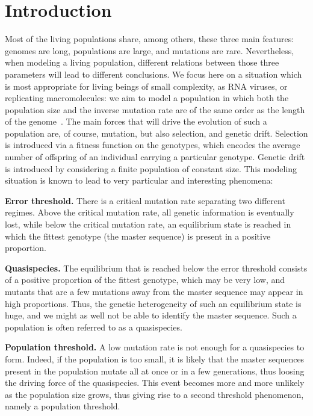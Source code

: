 \documentclass[a4paper,12pt]{article}
\theoremstyle{definition}
\theoremstyle{remark}
\begin{document}
\section{Introduction}
Most of the living populations share, among others, 
these three main features:
genomes are long, populations are large, and mutations are rare.
Nevertheless, when modeling a living population,
different relations between those three parameters
will lead to different conclusions.
We focus here on a situation which is most appropriate 
for living beings of small complexity,
as RNA viruses, or replicating macromolecules:
we aim to model a population in which
both the population size and the inverse mutation rate
are of the same order as the length of the genome~\cite{GEFS}.
The main forces that will drive the evolution of such a population
are, of course, mutation, but also selection, and genetic drift.
Selection is introduced via a fitness function on the genotypes,
which encodes the average number of offspring of an individual
carrying a particular genotype.
Genetic drift is introduced by considering a finite population of constant size.
This modeling situation is known to lead to very particular
and interesting phenomena:

\textbf{Error threshold.} 
There is a critical mutation rate separating two different regimes.
Above the critical mutation rate, all genetic information is eventually lost,
while below the critical mutation rate, an equilibrium state is reached
in which the fittest genotype (the master sequence) is present in a positive proportion.

\textbf{Quasispecies.}
The equilibrium that is reached below the error threshold 
consists of a positive proportion of the fittest genotype,
which may be very low, and mutants that are a few mutations away
from the master sequence may appear in high proportions.
Thus, the genetic heterogeneity of such an equilibrium state is huge,
and we might as well not be able to identify the master sequence.
Such a population is often referred to as a quasispecies.

\textbf{Population threshold.}
A low mutation rate is not enough for a quasispecies to form.
Indeed, if the population is too small, it is likely that the master sequences
present in the population mutate all at once or in a few generations,
thus loosing the driving force of the quasispecies. This event becomes
more and more unlikely as the population size grows,
thus giving rise to a second threshold phenomenon, namely a population threshold.
\end{document}
